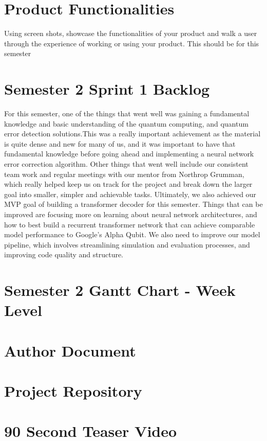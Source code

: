 \documentclass[12pt]{article}
\begin{document}
\section{Product Functionalities}

Using screen shots, showcase the functionalities of your product and walk a user through the experience of working or using your product. This should be for this semester

\section{Semester 2 Sprint 1 Backlog}

For this semester, one of the things that went well was gaining a fundamental knowledge and basic understanding of the quantum computing, 
and quantum error detection solutions.This was a really important achievement as the material is quite dense and new for many of us, 
and it was important to have that fundamental knowledge before going ahead and implementing a neural network error correction algorithm. 
Other things that went well include our consistent team work and regular meetings with our mentor from Northrop Grumman, which really 
helped keep us on track for the project and break down the larger goal into smaller, simpler and achievable tasks. Ultimately, we 
also achieved our MVP goal of building a transformer decoder for this semester. Things that can be improved are focusing more on 
learning about neural network architectures, and how to best build a recurrent transformer network that can achieve comparable 
model performance to Google’s Alpha Qubit. We also need to improve our model pipeline, which involves streamlining simulation and 
evaluation processes, and improving code quality and structure. 

\section{Semester 2 Gantt Chart - Week Level}

\section{Author Document}

\section{Project Repository}

\section{90 Second Teaser Video}
\end{document}
